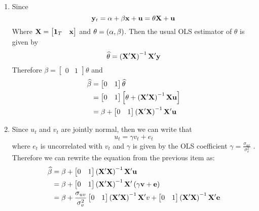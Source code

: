\begin{solution}
\begin{enumerate}[label = (\alph*)]
    \item Since
    \[
        \mathbf{y}_t = \alpha + \beta \mathbf{x} + \mathbf{u} = \theta\mathbf{X} + \mathbf{u}
    \]
    Where \(\mathbf{X} = \begin{bmatrix} \mathbf{1}_T & \mathbf{x} \end{bmatrix}\) and \(\theta = \left( \alpha , \beta \right)\). Then the usual OLS estimator of \(\theta\) is given by
    \[
        \widehat{\theta} = \left(\mathbf{X}^\prime \mathbf{X} \right)^{-1}\mathbf{X}^\prime \mathbf{y}
    \]
    Therefore \(\beta = \begin{bmatrix} 0 & 1 \end{bmatrix}\theta \) and
    \begin{align*}
        \widehat{\beta} & = \begin{bmatrix} 0 & 1 \end{bmatrix}\widehat{\theta} \\
        & = \begin{bmatrix} 0 & 1 \end{bmatrix}\left[ \theta + \left( \mathbf{X}^\prime\mathbf{X} \right)^{-1}\mathbf{X} \mathbf{u} \right] \\
        & = \beta + \begin{bmatrix} 0 & 1 \end{bmatrix} \left( \mathbf{X}^\prime \mathbf{X} \right)^{-1}\mathbf{X}^\prime \mathbf{u}
    \end{align*}

    \item\label{item:u_decomp_solution} Since \(u_t\) and \(v_t\) are jointly normal, then we can write that 
    \[
        u_t = \gamma v_t + e_t
    \]
    where \(e_t\) is uncorrelated with \(v_t\) and \(\gamma\) is given by the OLS coefficient \(\gamma = \frac{\sigma_{uv}}{\sigma_v^2}\) . Therefore we can rewrite the equation from the previous item as:
    \begin{align*}
        \widehat{\beta} & = \beta + \begin{bmatrix} 0 & 1 \end{bmatrix}\left( \mathbf{X}^\prime \mathbf{X} \right)^{-1}\mathbf{X}^\prime \mathbf{u} \\
        & = \beta + \begin{bmatrix} 0 & 1 \end{bmatrix}\left( \mathbf{X}^\prime \mathbf{X} \right)^{-1}\mathbf{X}^\prime  \left( \gamma \mathbf{v} + \mathbf{e} \right) \\
        & = \beta + \frac{\sigma_{uv}}{\sigma_v^2}\begin{bmatrix} 0 & 1 \end{bmatrix}\left( \mathbf{X}^\prime \mathbf{X} \right)^{-1} \mathbf{X}^\prime v + \begin{bmatrix} 0 & 1 \end{bmatrix}\left( \mathbf{X}^\prime \mathbf{X} \right)^{-1}\mathbf{X}^\prime \mathbf{e}
    \end{align*}
        

\end{enumerate}
\end{solution}
